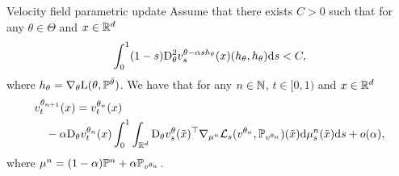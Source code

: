 \documentclass{article}
\begin{document}
\begin{proposition}{Velocity field parametric update}{}
Assume that there exists $C > 0$ such that for any $\theta \in \Theta$ and $x \in \mathbb{R}^d$
\begin{equation}
\label{eq:integrability_condition}
    \int_0^1   (1-s) \mathrm{D}_\theta^2 v_s^{\theta - \alpha s h_\theta}(x) (h_\theta, h_\theta) \rmd s < C ,
\end{equation}
where $h_\theta = \nabla_\theta \mathrm{L}(\theta, \mathbb{P}^{\bar{\theta}})$. 
We have that for any $n \in \mathbb{N}$, $t \in [0,1)$ and $x \in \mathbb{R}^d$
\begin{align}
\label{eq:taylor_expansion}
   & v^{\theta_{n+1}}_t(x) = v^{\theta_n}_t(x) \\
   & \quad - \alpha \mathrm{D}_\theta v_t^{\theta_n}(x) \int_0^1 \int_{\rset^d} \mathrm{D}_\theta v_{s}^\theta(\tilde{x})^\top \nabla_{\mu^n} \Lnonparam_s(v^{\theta_n}, \Pbb_{v^{\theta_n}})(\tilde{x})  \rmd \mu^n_s(\tilde{x}) \rmd s+ o(\alpha) ,
\end{align}
where $\mu^{n} = (1- \alpha) \mathbb{P}^n + \alpha \mathbb{P}_{v^{\theta_n}}$.
\end{proposition}
\end{document}
